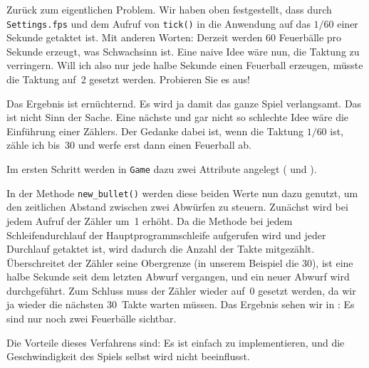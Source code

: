 

Zurück zum eigentlichen Problem. Wir haben oben festgestellt, dass durch \texttt{Settings.fps} und dem Aufruf von \texttt{tick()} in  die Anwendung auf das $1/60$ einer Sekunde getaktet ist. Mit anderen Worten: Derzeit werden 60 Feuerbälle pro Sekunde erzeugt, was Schwachsinn ist. Eine naive Idee wäre nun, die Taktung zu verringern. Will ich also nur jede halbe Sekunde einen Feuerball erzeugen, müsste die Taktung auf~2 gesetzt werden. Probieren Sie es aus!

Das Ergebnis ist ernüchternd. Es wird ja damit das ganze Spiel verlangsamt. Das ist nicht Sinn der Sache. Eine nächste und gar nicht so schlechte Idee wäre die Einführung einer Zählers. Der Gedanke dabei ist, wenn die Taktung $1/60$ ist, zähle ich bis~30 und werfe erst dann einen Feuerball ab. 

Im ersten Schritt werden in \texttt{Game} dazu zwei Attribute angelegt ( und ). 



In der Methode \texttt{new\_bullet()} werden diese beiden Werte nun dazu genutzt, um den zeitlichen Abstand zwischen zwei Abwürfen zu steuern. Zunächst wird bei jedem Aufruf der Zähler um~1 erhöht. Da die Methode bei jedem Schleifendurchlauf der Hauptprogrammschleife aufgerufen wird und jeder Durchlauf getaktet ist, wird dadurch die Anzahl der Takte mitgezählt. Überschreitet der Zähler seine Obergrenze (in unserem Beispiel die 30), ist eine halbe Sekunde seit dem letzten Abwurf vergangen, und ein neuer Abwurf wird durchgeführt. Zum Schluss muss der Zähler wieder auf~0 gesetzt werden, da wir ja wieder die nächsten 30~Takte warten müssen. Das Ergebnis sehen wir in : Es sind nur noch zwei Feuerbälle sichtbar.




Die Vorteile dieses Verfahrens sind: Es ist einfach zu implementieren, und die Geschwindigkeit des Spiels selbst wird nicht beeinflusst. 

